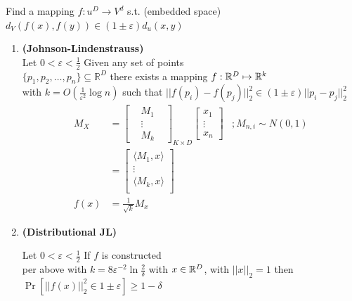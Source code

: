 \documentclass[12pt]{article}
\begin{document}
Find a mapping $f: u^D \to V^d$ s.t. (embedded space) $d_V(f(x), f(y)) \in (1\pm\varepsilon)d_u(x,y)$
\begin{enumerate}[align=left, labelwidth=1ex, start=1,label={Lemma \arabic*}]
	\item \textbf{(Johnson-Lindenstrauss)}\\
	Let $0<\varepsilon<\frac12$ Given any set of points\\
	$\{p_1, p_2, \dots, p_n \}\subseteq \mathbb{R}^D$ there exists a mapping $f: \mathbb R^D\mapsto\mathbb R^k$\\
	with $k=O(\frac{1}{\varepsilon^2}\log n)$ such that $||f(p_i)-f(p_j)||_2^2\in (1\pm \varepsilon)||p_i-p_j||_2 ^2$
	\begin{align}
	M_X
	&=\left[
	\begin{matrix}
	&M_1\\
	&\vdots&\\
	&M_k&
	\end{matrix}
	\right]_{K\times D} 
	\left[
	\begin{matrix}
	x_1\\
	\vdots
	\\
	x_n
	\end{matrix}
	\right]
	&;M_{n,i}\sim N(0,1)
	\\
	&=\left[
	\begin{matrix}
	\langle M_1, x \rangle\\
	\vdots\\
	\langle M_k, x \rangle\\
	\end{matrix}
	\right]\\
	f(x) &= \frac{1}{\sqrt k}M_x
	\end{align}
	\item \textbf{(Distributional JL)}
	
	Let $0 < \varepsilon < \frac12$ If $f$ is constructed\\
	 per above with $k=8\varepsilon^{-2}\ln\frac2\delta$ with $x \in\mathbb R^D$, with $||x||_2=1$ then\\ $\Pr[||f(x)||_2^2\in1\pm\varepsilon] \geq 1-\delta$
	

\end{enumerate}
\end{document}
